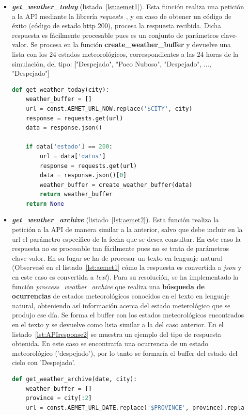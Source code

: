 \begin{itemize}
\item \textit{\textbf{get\_weather\_today}} (listado~\ref{lst:aemet1}). Esta función realiza una petición a la API mediante la librería \textit{requests}~\cite{Kenn11}, y en caso de obtener un código de éxito (código de estado http 200), procesa la respuesta recibida. Dicha respuesta es fácilmente procesable pues es un conjunto de parámetros clave-valor. Se procesa en la función \textbf{create\_weather\_buffer} y devuelve una lista con los 24 estados meteorológicos, correspondientes a las 24 horas de la simulación, del tipo: ["Despejado", "Poco Nuboso", "Despejado", ..., "Despejado"]
\begin{lstlisting}[language=Python,float=ht,caption={Función para obtener los valores meteorológicos del día en curso},label={lst:aemet1}]
def get_weather_today(city):
    weather_buffer = []
    url = const.AEMET_URL_NOW.replace('$CITY', city)
    response = requests.get(url)
    data = response.json()

    if data['estado'] == 200:
        url = data['datos']
        response = requests.get(url)
        data = response.json()[0]
        weather_buffer = create_weather_buffer(data)
        return weather_buffer
    return None
\end{lstlisting}

\item \textit{\textbf{get\_weather\_archive}} (listado~\ref{lst:aemet2}). Esta función realiza la petición a la API de manera similar a la anterior, salvo que debe incluir en la url el parámetro específico de la fecha que se desea consultar. En este caso la respuesta no es procesable tan fácilmente pues no se trata de parámetros clave-valor. En su lugar se ha de procesar un texto en lenguaje natural (Observesé en el listado~\ref{lst:aemet1} cómo la respuesta es convertida a \textit{json} y en este caso es convertida a \textit{text}). Para su resolución, se ha implementado la función \textit{proccess\_weather\_archive} que realiza una \textbf{búsqueda de ocurrencias} de estados meteorológicos conocidos en el texto en lenguaje natural, obteniendo así información acerca del estado meterológico que se produjo ese día. Se forma el buffer con los estados meteorológicos encontrados en el texto y se devuelve como lista similar a la del caso anterior. En el listado~\ref{lst:APIresponse2} se muestra un ejemplo del tipo de respuesta obtenida. En este caso se encontraría una ocurrencia de un estado meteorológico ('despejado'), por lo tanto se formaría el buffer del estado del cielo con 'Despejado'.
\begin{lstlisting}[language=Python,float=ht,caption={Función para obtener los valores meteorológicos de un día concreto},label={lst:aemet2}]
def get_weather_archive(date, city):
    weather_buffer = []
    province = city[:2]
    url = const.AEMET_URL_DATE.replace('$PROVINCE', province).replace('$DATE', date)


\end{lstlisting}
\end{itemize}
